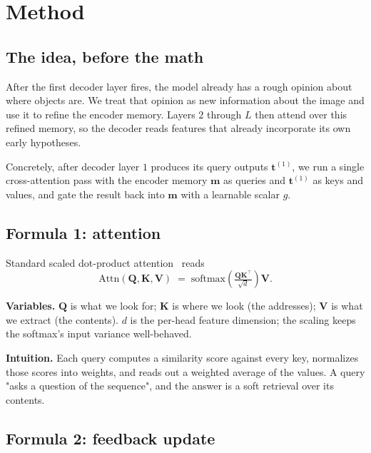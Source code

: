 \section{Method}
\label{sec:method}

\subsection{The idea, before the math}

After the first decoder layer fires, the model already has a rough opinion about where objects are. We treat that opinion as new information about the image and use it to refine the encoder memory. Layers $2$ through $L$ then attend over this refined memory, so the decoder reads features that already incorporate its own early hypotheses.

Concretely, after decoder layer $1$ produces its query outputs $\mathbf{t}^{(1)}$, we run a single cross-attention pass with the encoder memory $\mathbf{m}$ as queries and $\mathbf{t}^{(1)}$ as keys and values, and gate the result back into $\mathbf{m}$ with a learnable scalar $g$.

\subsection{Formula 1: attention}

Standard scaled dot-product attention~\cite{vaswani2017attention} reads
\begin{equation}
    \mathrm{Attn}(\mathbf{Q}, \mathbf{K}, \mathbf{V}) \;=\; \mathrm{softmax}\!\left(\tfrac{\mathbf{Q}\mathbf{K}^{\top}}{\sqrt{d}}\right) \mathbf{V}.
    \label{eq:attn}
\end{equation}

\noindent\textbf{Variables.} $\mathbf{Q}$ is what we look for; $\mathbf{K}$ is where we look (the addresses); $\mathbf{V}$ is what we extract (the contents). $d$ is the per-head feature dimension; the scaling keeps the softmax's input variance well-behaved.

\noindent\textbf{Intuition.} Each query computes a similarity score against every key, normalizes those scores into weights, and reads out a weighted average of the values. A query "asks a question of the sequence", and the answer is a soft retrieval over its contents.

\subsection{Formula 2: feedback update}

